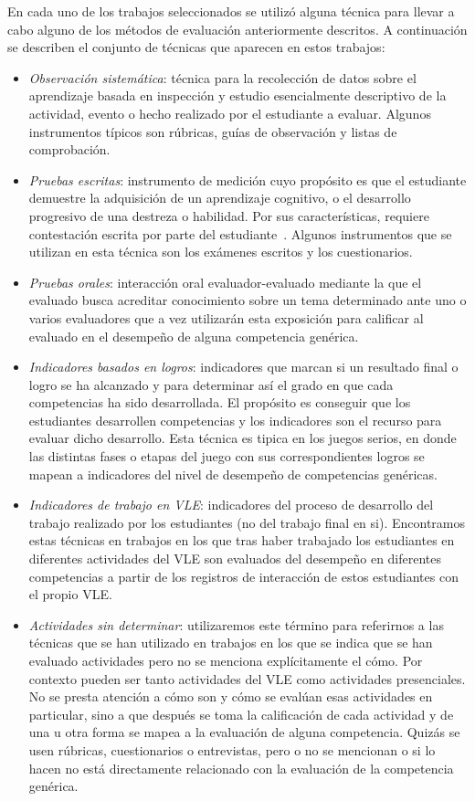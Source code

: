 En cada uno de los trabajos seleccionados se utilizó alguna técnica para llevar a cabo alguno de los métodos de evaluación anteriormente descritos. A continuación se describen el conjunto de técnicas que aparecen en estos trabajos:

\begin{itemize}
\item \emph{Observación sistemática}: técnica para la recolección de datos sobre el aprendizaje basada en inspección y estudio esencialmente descriptivo de la actividad, evento o hecho realizado por el estudiante a evaluar.  Algunos instrumentos típicos son rúbricas, guías de observación y listas de comprobación.
\item \emph{Pruebas escritas}: instrumento de medición cuyo propósito es que el estudiante demuestre la adquisición de un aprendizaje cognitivo, o el desarrollo progresivo de una destreza o habilidad. Por sus características, requiere contestación escrita por parte del estudiante~\cite{rojas2008prueba}. Algunos instrumentos que se utilizan en esta técnica son los exámenes escritos y los cuestionarios.
\item \emph{Pruebas orales}: interacción oral evaluador-evaluado mediante la que el evaluado busca acreditar conocimiento sobre un tema determinado ante uno o varios evaluadores que a vez utilizarán esta exposición para calificar al evaluado en el desempeño de alguna competencia genérica. 
\item \emph{Indicadores basados en logros}: indicadores que marcan si un resultado final o logro se ha alcanzado y para determinar así el grado en que cada competencias ha sido desarrollada. El propósito es conseguir que los estudiantes desarrollen competencias y los indicadores son el recurso para evaluar dicho desarrollo. Esta técnica es tipica en los juegos serios, en donde las distintas fases o etapas del juego con sus correspondientes logros se mapean a indicadores del nivel de desempeño de competencias genéricas.
\item \emph{Indicadores de trabajo en VLE}: indicadores del proceso de desarrollo del trabajo realizado por los estudiantes (no del trabajo final en si). Encontramos estas técnicas en trabajos en los que tras haber trabajado los estudiantes en diferentes actividades del VLE son evaluados del desempeño en diferentes competencias a partir de los registros de interacción de estos estudiantes con el propio VLE. 
\item \emph{Actividades sin determinar}: utilizaremos este término para referirnos a las técnicas que se han utilizado en trabajos en los que se indica que se han evaluado actividades pero no se menciona explícitamente el cómo. Por contexto pueden ser tanto actividades del VLE como actividades presenciales. No se presta atención a cómo son y cómo se evalúan esas actividades en particular, sino a que después se toma la calificación de cada actividad y de una u otra forma se mapea a la evaluación de alguna competencia. Quizás se usen rúbricas, cuestionarios o entrevistas, pero o no se mencionan o si lo hacen no está directamente relacionado con la evaluación de la competencia genérica.
\end{itemize}

